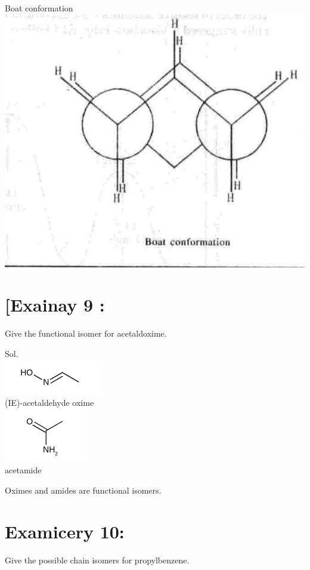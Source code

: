\documentclass[10pt]{article}
\begin{document}
Boat conformation\\
\includegraphics[max width=\textwidth, center]{2025_01_28_8470952b98110cec3aabg-062(3)}

\section*{[Exainay 9 :}
Give the functional isomer for acetaldoxime.

Sol.\\
\includegraphics{smile-68ce6cf0d6269a62256ddac0ce698b39ca609357}\\
(IE)-acetaldehyde oxime\\
\includegraphics{smile-4ae4c5f399171c9884583b2d54b471f27a469cc1}\\
acetamide

Oximes and amides are functional isomers.

\section*{Examicery 10:}
Give the possible chain isomers for propylbenzene.
\end{document}
